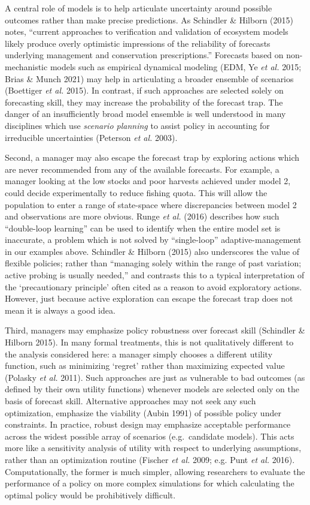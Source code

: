 \documentclass[3p]{elsarticle} %
\begin{document}
A central role of models is to help articulate uncertainty around
possible outcomes rather than make precise predictions. As Schindler \&
Hilborn (2015) notes, ``current approaches to verification and
validation of ecosystem models likely produce overly optimistic
impressions of the reliability of forecasts underlying management and
conservation prescriptions.'' Forecasts based on non-mechanistic models
such as empirical dynamical modeling (EDM, Ye \emph{et al.} 2015; Brias
\& Munch 2021) may help in articulating a broader ensemble of scenarios
(Boettiger \emph{et al.} 2015). In contrast, if such approaches are
selected solely on forecasting skill, they may increase the probability
of the forecast trap. The danger of an insufficiently broad model
ensemble is well understood in many disciplines which use \emph{scenario
planning} to assist policy in accounting for irreducible uncertainties
(Peterson \emph{et al.} 2003).

Second, a manager may also escape the forecast trap by exploring actions
which are never recommended from any of the available forecasts. For
example, a manager looking at the low stocks and poor harvests achieved
under model 2, could decide experimentally to reduce fishing quota. This
will allow the population to enter a range of state-space where
discrepancies between model 2 and observations are more obvious. Runge
\emph{et al.} (2016) describes how such ``double-loop learning'' can be
used to identify when the entire model set is inaccurate, a problem
which is not solved by ``single-loop'' adaptive-management in our
examples above. Schindler \& Hilborn (2015) also underscores the value
of flexible policies; rather than ``managing solely within the range of
past variation; active probing is usually needed,'' and contrasts this
to a typical interpretation of the `precautionary principle' often cited
as a reason to avoid exploratory actions. However, just because active
exploration can escape the forecast trap does not mean it is always a
good idea.

Third, managers may emphasize policy robustness over forecast skill
(Schindler \& Hilborn 2015). In many formal treatments, this is not
qualitatively different to the analysis considered here: a manager
simply chooses a different utility function, such as minimizing `regret'
rather than maximizing expected value (Polasky \emph{et al.} 2011). Such
approaches are just as vulnerable to bad outcomes (as defined by their
own utility functions) whenever models are selected only on the basis of
forecast skill. Alternative approaches may not seek any such
optimization, emphasize the viability (Aubin 1991) of possible policy
under constraints. In practice, robust design may emphasize acceptable
performance across the widest possible array of scenarios
(e.g.~candidate models). This acts more like a sensitivity analysis of
utility with respect to underlying assumptions, rather than an
optimization routine (Fischer \emph{et al.} 2009; e.g. Punt \emph{et
al.} 2016). Computationally, the former is much simpler, allowing
researchers to evaluate the performance of a policy on more complex
simulations for which calculating the optimal policy would be
prohibitively difficult.
\end{document}

